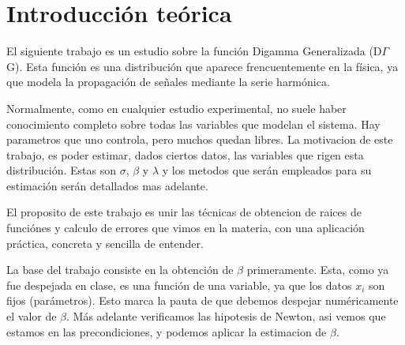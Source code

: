 \section{Introducci\'on teórica}

El siguiente trabajo es un estudio sobre la funci\'on Digamma Generalizada (D$\Gamma$G). Esta funci\'on es una
distribuci\'on que aparece frencuentemente en la f\'isica, ya que modela la propagaci\'on de se\~nales mediante la
serie harm\'onica.

Normalmente, como en cualquier estudio experimental, no suele haber conocimiento completo sobre todas las variables
que modelan el sistema. Hay parametros que uno controla, pero muchos quedan libres. La motivacion de este trabajo,
es poder estimar, dados ciertos datos, las variables que rigen esta distribuci\'on. Estas son $\sigma$, $\beta$ y $\lambda$
y los metodos que ser\'an empleados para su estimaci\'on ser\'an detallados mas adelante.

El proposito de este trabajo es unir las t\'ecnicas de obtencion de raices de funci\'ones y calculo de errores
que vimos en la materia, con una aplicaci\'on pr\'actica, concreta y sencilla de entender.

La base del trabajo consiste en la obtenci\'on de $\beta$ primeramente. Esta, como ya fue despejada en clase, es una funci\'on
de una variable, ya que los datos $x_i$ son fijos (par\'ametros). Esto marca la pauta de que debemos despejar num\'ericamente el
valor de $\beta$. M\'as adelante verificamos las hipotesis de Newton, asi vemos que estamos en las precondiciones,
y podemos aplicar la estimacion de $\beta$.